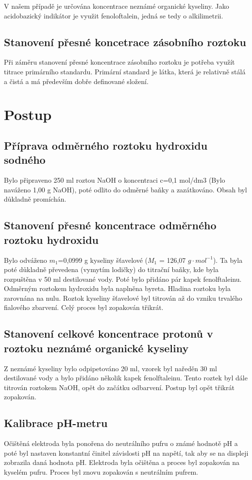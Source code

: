 \documentclass[13pt, a4paper, twoside]{article}
\begin{document}
    V našem případě je určována koncentrace neznámé
    organické kyseliny. Jako acidobazický indikátor je využit fenoloftalein, jedná se
    tedy o alkilimetrii.
    \subsection*{Stanovení přesné koncetrace zásobního roztoku}
    Při záměru stanovení přesné koncentrace zásobního roztoku je potřeba využít titrace
    primárního standardu. Primární standard je látka, která je relativně stálá a čistá
    a má především dobře definované složení.

    \section*{Postup}
    \subsection*{Příprava odměrného roztoku hydroxidu sodného}
    Bylo připraveno 250 ml roztou NaOH o koncentraci c=0,1 mol/dm3
    (Bylo naváženo 1,00 g NaOH), poté odlito do odměrné baňky a zazátkováno.
    Obsah byl důkladně promíchán.
    \subsection*{Stanovení přesné koncentrace odměrného roztoku hydroxidu}
    Bylo odváženo $m_1$=0,0999 g kyseliny šťavelové ($M_1$ = 126,07 $g \cdot mol^{-1}$). Ta byla poté důkladně převedena (vymytím lodičky) do titrační baňky, kde byla rozpuštěna v 50 ml destilované vody. Poté bylo přidáno pár kapek fenolftaleinu.
    Odměrným roztokem hydroxidu byla naplněna byreta. Hladina roztoku byla zarovnána na nulu. Roztok kyseliny šťavelové byl titrován až do vzniku trvalého fialového zbarvení. Celý proces byl zopakován třikrát.
    
    \subsection*{Stanovení celkové koncentrace protonů v roztoku neznámé organické kyseliny}
    Z neznámé kyseliny bylo odpipetováno 20 ml, vzorek byl naředěn 30 ml destilované vody a bylo přidáno několik kapek fenolftaleinu. Tento roztek byl dále titrován roztokem NaOH, opět do začátku odbarvení. Postup byl opět třikrát zopakován.

    \subsection*{Kalibrace pH-metru}
    Očištěná elektroda byla ponořena do neutrálního pufru o známé hodnotě pH a poté byl nastaven konstantní činitel závislosti pH na napětí, tak aby se na displeji zobrazila daná hodnota pH. Elektroda byla očištěna a proces byl zopakován na kyselém pufru. Proces byl znovu zopakován s neutrálním pufrem.
\end{document}
